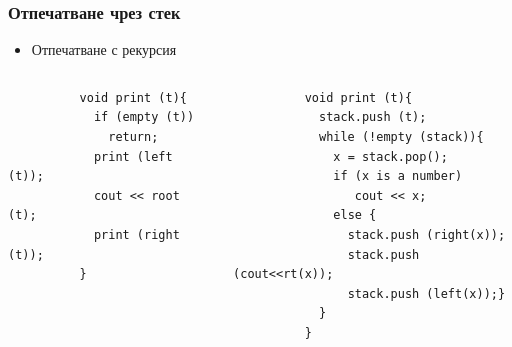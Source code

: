 \documentclass{beamer}
\begin{document}
\begin{frame}[fragile]
\frametitle{Отпечатване чрез стек}

\begin{itemize}
  \item Отпечатване с рекурсия
\end{itemize}


\begin{columns}[t]
  \begin{column}{0.4\textwidth}
      \begin{flushleft}
        \begin{lstlisting}
          void print (t){
            if (empty (t))
              return;
            print (left (t));
            cout << root (t);
            print (right (t));
          }
        \end{lstlisting}
      \end{flushleft}

  \end{column}
  \begin{column}{0.6\textwidth}

      \begin{flushleft}
        \begin{lstlisting}
          void print (t){
            stack.push (t);
            while (!empty (stack)){
              x = stack.pop();
              if (x is a number)
                 cout << x;
              else {
                stack.push (right(x));
                stack.push (cout<<rt(x));
                stack.push (left(x));}
            }
          }
        \end{lstlisting}
      \end{flushleft}

  \end{column}
\end{columns}




\end{frame}
\end{document}
